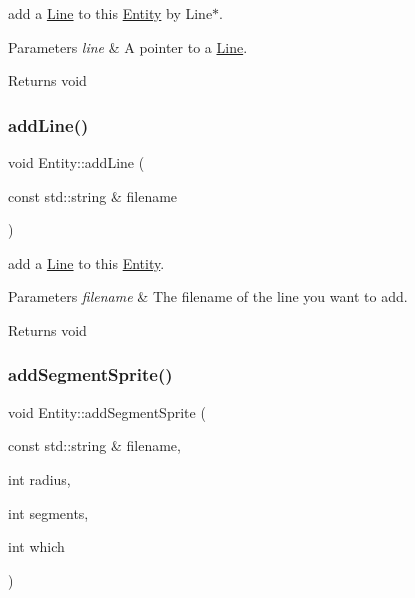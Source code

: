 add a \hyperlink{class_line}{Line} to this \hyperlink{class_entity}{Entity} by Line$\ast$. 


\begin{DoxyParams}{Parameters}
{\em line} & A pointer to a \hyperlink{class_line}{Line}. \\
\hline
\end{DoxyParams}
\begin{DoxyReturn}{Returns}
void 
\end{DoxyReturn}
\mbox{\label{class_entity_a9383f0d8ce804b216fc6e8164b4466a5}} 
\subsubsection{\texorpdfstring{add\+Line()}{addLine()}\hspace{0.1cm}{\footnotesize\ttfamily [2/2]}}
{\footnotesize\ttfamily void Entity\+::add\+Line (\begin{DoxyParamCaption}\item[{const std\+::string \&}]{filename }\end{DoxyParamCaption})}



add a \hyperlink{class_line}{Line} to this \hyperlink{class_entity}{Entity}. 


\begin{DoxyParams}{Parameters}
{\em filename} & The filename of the line you want to add. \\
\hline
\end{DoxyParams}
\begin{DoxyReturn}{Returns}
void 
\end{DoxyReturn}
\mbox{\label{class_entity_a30b6c9e7d43616a622efa168b0b143e1}} 
\subsubsection{\texorpdfstring{add\+Segment\+Sprite()}{addSegmentSprite()}}
{\footnotesize\ttfamily void Entity\+::add\+Segment\+Sprite (\begin{DoxyParamCaption}\item[{const std\+::string \&}]{filename,  }\item[{int}]{radius,  }\item[{int}]{segments,  }\item[{int}]{which }\end{DoxyParamCaption})}



